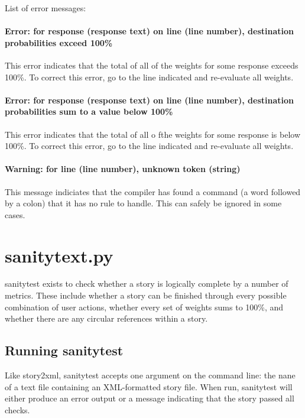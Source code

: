 \documentclass[12pt,letterpaper]{article}
\begin{document}
 List of error messages:
 \paragraph{Error: for response (response text) on line (line number), destination probabilities exceed 100\%}
 This error indicates that the total of all of the weights for some response exceeds 100\%. To correct this error, go to the line indicated and re-evaluate all weights.
 \paragraph{Error: for response (response text) on line (line number), destination probabilities sum to a value below 100\%}
 This error indicates that the total of all o fthe weights for some response is below 100\%. To correct this error, go to the line indicated and re-evaluate all weights.
 \paragraph{Warning: for line (line number), unknown token (string)}
 This message indiciates that the compiler has found a command (a word followed by a colon) that it has no rule to handle. This can safely be ignored in some cases.
 
 \section{sanitytext.py}
 sanitytest exists to check whether a story is logically complete by a number of metrics. These include whether a story can be finished through every possible
 combination of user actions, whether every set of weights sums to 100\%, and whether there are any circular references within a story. 
 
 \subsection{Running sanitytest}
 Like story2xml, sanitytest accepts one argument on the command line: the nane of a text file containing an XML-formatted story file.
 When run, sanitytest will either produce an error output or a message indicating that the story passed all checks.
 
\end{document}
